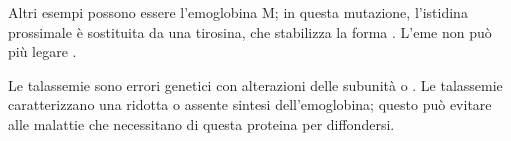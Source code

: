 Altri esempi possono essere l'emoglobina M;{} in questa mutazione, l'istidina prossimale è sostituita da una tirosina, che stabilizza la forma . L'eme non può più legare .

Le talassemie sono errori genetici con alterazioni delle subunità \alpha{} o \beta. Le talassemie caratterizzano una ridotta o assente sintesi dell'emoglobina; questo può evitare alle malattie che necessitano di questa proteina per diffondersi.


